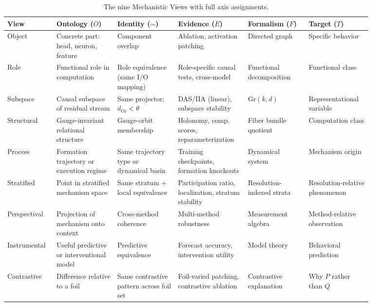 \documentclass{article}
\newcommand{\Gr}{\mathrm{Gr}}
\begin{document}
\begin{table}[H]
\centering
\small
\setlength{\tabcolsep}{4pt}
\begin{tabular}{p{0.10\linewidth}p{0.15\linewidth}p{0.15\linewidth}p{0.17\linewidth}p{0.15\linewidth}p{0.15\linewidth}}
\toprule
\textbf{View} & \textbf{Ontology ($O$)} & \textbf{Identity ($\sim$)}
  & \textbf{Evidence ($E$)} & \textbf{Formalism ($F$)} & \textbf{Target ($T$)} \\
\midrule
Object
  & Concrete part: head, neuron, feature
  & Component overlap
  & Ablation, activation patching
  & Directed graph
  & Specific behavior \\[3pt]
Role
  & Functional role in computation
  & Role equivalence (same I/O mapping)
  & Role-specific causal tests, cross-model
  & Functional decomposition
  & Functional class \\[3pt]
Subspace
  & Causal subspace of residual stream
  & Same projector; $d_{\Gr} < \theta$
  & DAS/IIA (linear), subspace stability
  & $\Gr(k,d)$
  & Representational variable \\[3pt]
Structural
  & Gauge-invariant relational structure
  & Gauge-orbit membership
  & Holonomy, comp. scores, reparameterization
  & Fiber bundle quotient
  & Computation class \\[3pt]
Process
  & Formation trajectory or execution regime
  & Same trajectory type or dynamical basin
  & Training checkpoints, formation knockouts
  & Dynamical system
  & Mechanism origin \\[3pt]
Stratified
  & Point in stratified mechanism space
  & Same stratum + local equivalence
  & Participation ratio, localization, stratum stability
  & Resolution-indexed strata
  & Resolution-relative phenomenon \\[3pt]
Perspectival
  & Projection of mechanism onto context
  & Cross-method coherence
  & Multi-method robustness
  & Measurement algebra
  & Method-relative observation \\[3pt]
Instrumental
  & Useful predictive or interventional model
  & Predictive equivalence
  & Forecast accuracy, intervention utility
  & Model theory
  & Behavioral prediction \\[3pt]
Contrastive
  & Difference relative to a foil
  & Same contrastive pattern across foil set
  & Foil-varied patching, contrastive ablation
  & Contrastive explanation
  & Why $P$ rather than $Q$ \\
\bottomrule
\end{tabular}
\caption{The nine Mechanistic Views with full axis assignments.}
\label{tab:atlas}
\end{table}
\end{document}
